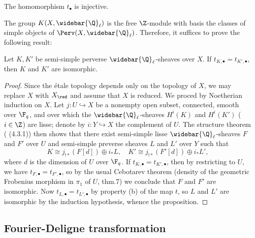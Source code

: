 \begin{proposition}\label{scheme sheaf-function correspondence injective}
The homomorphism $t_\bullet$ is injective.
\end{proposition}
The group $K(X,\widebar{\Q}_\ell)$ is the free $\Z$-module with basis the classes of simple objects of $\Perv(X,\widebar{\Q}_\ell)$. Therefore, it suffices to prove the following result:
\begin{proposition}
Let $K,K'$ be semi-simple perverse $\widebar{\Q}_\ell$-sheaves over $X$. If $t_{K,\bullet}=t_{K',\bullet}$, then $K$ and $K'$ are isomorphic.
\end{proposition}
\begin{proof}
Since the \'etale topology depends only on the topology of $X$, we may replace $X$ with $X_\red$ and assume that $X$ is reduced. We proced by Noetherian induction on $X$. Let $j:U\hookrightarrow X$ be a nonempty open subset, connected, smooth over $\F_q$, and over which the $\widebar{\Q}_\ell$-sheaves $H^i(K)$ and $H^i(K')$ ($i\in\Z$) are lisse; denote by $i:Y\hookrightarrow X$ the complement of $U$. The structure theorem (\cite{BBD} (4.3.1)) then shows that there exist semi-simple lisse $\widebar{\Q}_\ell$-sheaves $F$ and $F'$ over $U$ and semi-simple preverse sheaves $L$ and $L'$ over $Y$ such that
\[K\cong j_{!*}(F[d])\oplus i_*L,\quad K'\cong j_{!*}(F'[d])\oplus i_*L',\]
where $d$ is the dimension of $U$ over $\F_q$. If $t_{K,\bullet}=t_{K',\bullet}$, then by restricting to $U$, we have $t_{F,\bullet}=t_{F',\bullet}$, so by the usual Cebotarev theorem (density of the geometric Frobenius morphism in $\pi_1$ of $U$, \cite{Se5} thm.7) we conclude that $F$ and $F'$ are isomorphic. Now $t_{L,\bullet}=t_{L',\bullet}$ by property (b) of the map $t$, so $L$ and $L'$ are isomorphic by the induction hypothesis, whence the proposition.
\end{proof}

\subsection{Fourier-Deligne transformation}
